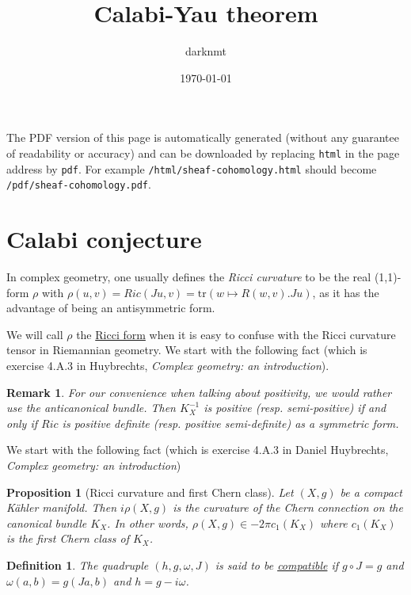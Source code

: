 \documentclass[11pt]{article}
\author{darknmt}
\date{\today}
\title{Calabi-Yau theorem}
\newtheorem{remark}{Remark}
\newtheorem{proposition}{Proposition}[theorem]
\newtheorem{definition}{Definition}
\begin{document}
\maketitle
\tableofcontents

\begin{info}
The PDF version of this page is automatically generated (without any guarantee of
readability or accuracy) and can be downloaded by replacing \texttt{html} in the page address by
\texttt{pdf}. 
For example \texttt{/html/sheaf-cohomology.html} should become \texttt{/pdf/sheaf-cohomology.pdf}.
\end{info}

\section{Calabi conjecture}
\label{sec:org0cb0938}

In complex geometry, one usually defines the \emph{Ricci curvature} to be the real (1,1)-form \(\rho\)
with \(\rho(u,v) = Ric(Ju, v) = \text{tr}(w \mapsto R(w,v).Ju)\), as it has the advantage of being an
antisymmetric form.

We will call \(\rho\) the \uline{Ricci form} when it is easy to confuse with the Ricci
curvature tensor in Riemannian geometry. We start with the following fact (which is exercise 4.A.3
in Huybrechts, \emph{Complex geometry: an introduction}).

\begin{remark}
For our convenience when talking about positivity, we would rather use the anticanonical
bundle. Then \(K_{X}^{-1}\) is positive (resp. semi-positive) if and only if \(Ric\) is positive
definite (resp. positive semi-definite) as a symmetric form.
\end{remark}



We start with the following fact (which is exercise 4.A.3 in Daniel Huybrechts, \emph{Complex geometry: an introduction})

\begin{proposition}[Ricci curvature and first Chern class]
Let \((X,g)\) be a compact Kähler manifold. Then \(i\rho(X,g)\) is the curvature of the Chern connection
on the canonical bundle \(K_X\). In other words, \(\rho(X,g)\in -2\pi c_1(K_X)\) where
\(c_1(K_X)\) is the first Chern class of \(K_X\).
\end{proposition}


\begin{definition}
The quadruple \((h, g, \omega, J)\) is said to be \uline{compatible} if \(g\circ J = g\) and \(\omega(a,b) =
g(Ja,b)\) and \(h = g - i\omega\). 
\end{definition}
\end{document}
